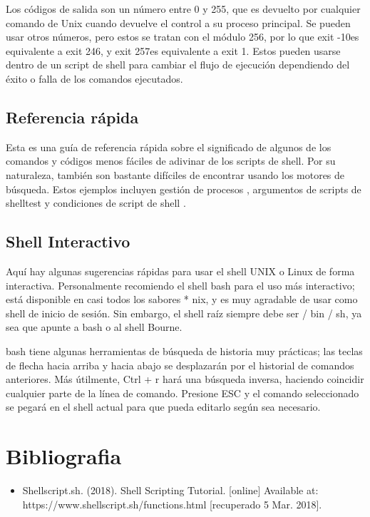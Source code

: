 \documentclass{article}
\begin{document}
\begin{itemize}
Los códigos de salida son un número entre 0 y 255, que es devuelto por cualquier comando de Unix cuando devuelve el control a su proceso principal. 
Se pueden usar otros números, pero estos se tratan con el módulo 256, por lo que exit -10es equivalente a exit 246, y exit 257es equivalente a exit 1.
Estos pueden usarse dentro de un script de shell para cambiar el flujo de ejecución dependiendo del éxito o falla de los comandos ejecutados. 


\subsection{Referencia rápida}

Esta es una guía de referencia rápida sobre el significado de algunos de los comandos y códigos menos fáciles de adivinar de los scripts de shell. Por su naturaleza, también son bastante difíciles de encontrar usando los motores de búsqueda. Estos ejemplos incluyen gestión de procesos , argumentos de scripts de shelltest y condiciones de script de shell .



\subsection{Shell Interactivo}

Aquí hay algunas sugerencias rápidas para usar el shell UNIX o Linux de forma interactiva. Personalmente recomiendo el shell bash para el uso más interactivo; está disponible en casi todos los sabores * nix, y es muy agradable de usar como shell de inicio de sesión. Sin embargo, el shell raíz siempre debe ser / bin / sh, ya sea que apunte a bash o al shell Bourne.

bash tiene algunas herramientas de búsqueda de historia muy prácticas; las teclas de flecha hacia arriba y hacia abajo se desplazarán por el historial de comandos anteriores. Más útilmente, Ctrl + r hará una búsqueda inversa, haciendo coincidir cualquier parte de la línea de comando. Presione ESC y el comando seleccionado se pegará en el shell actual para que pueda editarlo según sea necesario.




\section{Bibliografia}
\begin{itemize}
\item Shellscript.sh. (2018). Shell Scripting Tutorial. [online] Available at: https://www.shellscript.sh/functions.html [recuperado 5 Mar. 2018].



\end{itemize}
\end{itemize}
\end{document}

